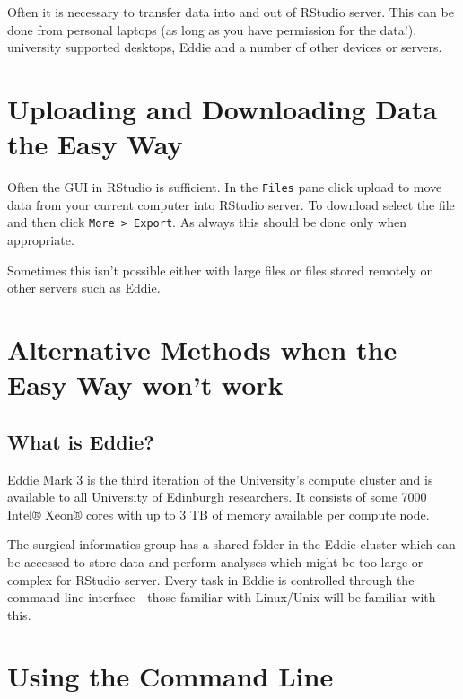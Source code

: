 \documentclass[
]{book}
\begin{document}
Often it is necessary to transfer data into and out of RStudio server. This can be done from personal laptops (as long as you have permission for the data!), university supported desktops, Eddie and a number of other devices or servers.

\hypertarget{uploading-and-downloading-data-the-easy-way}{%
\section{Uploading and Downloading Data the Easy Way}\label{uploading-and-downloading-data-the-easy-way}}

Often the GUI in RStudio is sufficient. In the \texttt{Files} pane click upload to move data from your current computer into RStudio server. To download select the file and then click \texttt{More\ \textgreater{}\ Export}. As always this should be done only when appropriate.

Sometimes this isn't possible either with large files or files stored remotely on other servers such as Eddie.

\hypertarget{alternative-methods-when-the-easy-way-wont-work}{%
\section{Alternative Methods when the Easy Way won't work}\label{alternative-methods-when-the-easy-way-wont-work}}

\hypertarget{what-is-eddie}{%
\subsection{What is Eddie?}\label{what-is-eddie}}

Eddie Mark 3 is the third iteration of the University's compute cluster and is available to all University of Edinburgh researchers. It consists of some 7000 Intel® Xeon® cores with up to 3 TB of memory available per compute node.

The surgical informatics group has a shared folder in the Eddie cluster which can be accessed to store data and perform analyses which might be too large or complex for RStudio server. Every task in Eddie is controlled through the command line interface - those familiar with Linux/Unix will be familiar with this.

\hypertarget{using-the-command-line}{%
\section{Using the Command Line}\label{using-the-command-line}}
\end{document}
